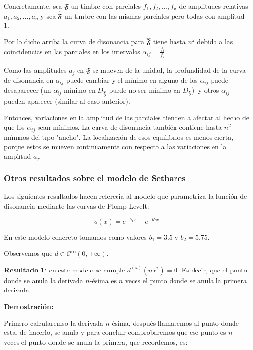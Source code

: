 \documentclass[11pt,a4paper]{article}
\begin{document}
Concretamente, sea $\mathfrak{F}$ un timbre con parciales $f_1, f_2,... , f_n$ de amplitudes relativas $a_1, a_2,... , a_n$ y sea $\mathfrak{\widehat{F}}$ un timbre con las mismas parciales pero todas con amplitud $1$. 

Por lo dicho arriba la curva de disonancia para $\mathfrak{\widehat{F}}$ tiene hasta $n^2$ debido a las coincidencias en las parciales en los intervalos $\alpha_{ij} = \frac{f_i}{f_j}$.

Como las amplitudes $a_j$ en $\mathfrak{F}$ se mueven de la unidad, la profundidad de la curva de disonancia en $\alpha_{ij}$ puede cambiar y el mínimo en alguno de los $\alpha_{ij}$ puede desaparecer (un $\alpha_{ij}$ mínimo en $D_{\mathfrak{\widehat{F}}}$ puede no ser mínimo en $D_{\mathfrak{F}}$), y otros $\alpha_{ij}$ pueden aparecer (similar al caso anterior).

Entonces, variaciones en la amplitud de las parciales tienden a afectar al hecho de que los $\alpha_{ij}$ sean mínimos. La curva de disonancia también contiene hasta $n^2$ mínimos del tipo "ancho". La localización de esos equilibrios es menos cierta, porque estos se mueven continuamente con respecto a las variaciones en la amplitud $a_j$.

\subsubsection{Otros resultados sobre el modelo de Sethares}

    Los siguientes resultados hacen referecia al modelo que parametriza la función de disonancia mediante las curvas de Plomp-Levelt:
    
    $$
        d(x) = e^{-b_1 x} - e^{-b2 x}
    $$
    
    En este modelo concreto tomamos como valores $b_1 = 3.5$ y $b_2 = 5.75$.
    
    Observemos que $d \in \mathcal{C}^{\infty} (0, +\infty)$.
    
\noindent\textbf{Resultado 1:} en este modelo se cumple $d^{(n)} (n x^{*}) = 0$. Es decir, que el punto donde se anula la derivada $n$-ésima es $n$ veces el punto donde se anula la primera derivada.

\noindent\textbf{Demostración:}

Primero calcularemso la derivada $n$-ésima, después llamaremos al punto donde esta, de hacerlo, se anula y para concluir comprobaremos que ese punto es $n$ veces el punto donde se anula la primera, que recordemos, es:
\end{document}
